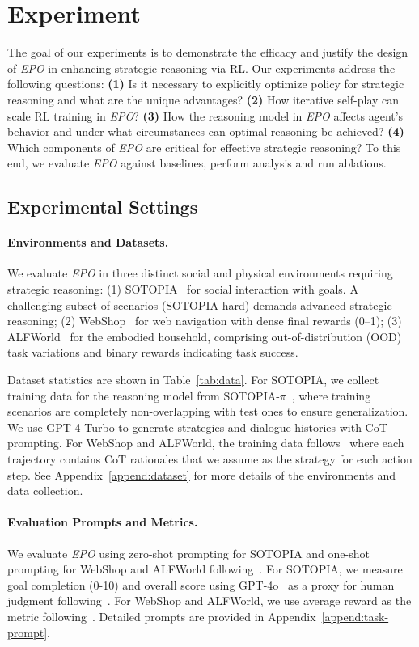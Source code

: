 \section{Experiment}
The goal of our experiments is to demonstrate the efficacy and justify the design of \textit{EPO} in enhancing strategic reasoning via RL.
Our experiments address the following questions: \textbf{(1)} Is it necessary to explicitly optimize policy for strategic reasoning and what are the unique advantages? 
\textbf{(2)} How iterative self-play can scale RL training in \textit{EPO}? \textbf{(3)} How the reasoning model in \textit{EPO} affects agent's behavior and under what circumstances can optimal reasoning be achieved? 
\textbf{(4)} Which components of \textit{EPO} are critical for effective strategic reasoning? 
To this end, we evaluate \textit{EPO} against baselines, perform analysis and run ablations.


\subsection{Experimental Settings}
\paragraph{\textbf{Environments and Datasets.}}
We evaluate \textit{EPO} in three distinct social and physical environments requiring strategic reasoning:
(1) SOTOPIA~\cite{zhou2024sotopia} for social interaction with goals. 
A challenging subset of scenarios (SOTOPIA-hard) demands advanced strategic reasoning;
(2) WebShop~\cite{yao2022webshop} for web navigation with dense final rewards (0–1); 
(3) ALFWorld~\cite{shridhar2021alfworld} for the embodied household, comprising out-of-distribution (OOD) task variations and binary rewards indicating task success.

Dataset statistics are shown in Table~\ref{tab:data}.
For SOTOPIA, we collect training data for the reasoning model from
SOTOPIA-$\pi$~\cite{Wang2024SOTOPIAIL}, where training scenarios are completely non-overlapping with test ones to ensure generalization.
We use GPT-4-Turbo to generate strategies and dialogue histories with CoT prompting.
For WebShop and ALFWorld, the training data follows~\cite{song-etal-2024-trial} where each trajectory contains CoT rationales that we assume as the strategy for each action step.
See Appendix~\ref{append:dataset} for more details of the environments and data collection.

\paragraph{\textbf{Evaluation Prompts and Metrics.}}
We evaluate \textit{EPO} using zero-shot prompting for SOTOPIA and one-shot prompting for WebShop and ALFWorld following~\cite{song-etal-2024-trial}. 
For SOTOPIA, we measure goal completion (0-10) and overall score using GPT-4o~\cite{4o} as a proxy for human judgment following~\cite{zhou2024sotopia}. 
For WebShop and ALFWorld, we use average reward as the metric following~\cite{song-etal-2024-trial}. Detailed prompts are provided in Appendix~\ref{append:task-prompt}.


